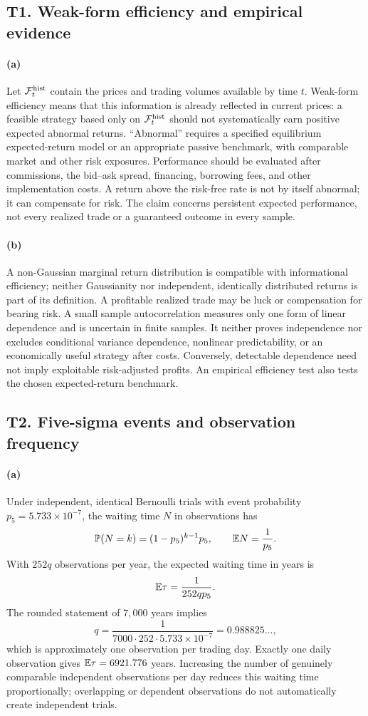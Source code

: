 \subsection{T1. Weak-form efficiency and empirical evidence}
\paragraph{(a)} Let $\mathcal F_t^{\rm hist}$ contain the prices and trading volumes available by time $t$. Weak-form efficiency means that this information is already reflected in current prices: a feasible strategy based only on $\mathcal F_t^{\rm hist}$ should not systematically earn positive expected abnormal returns. ``Abnormal'' requires a specified equilibrium expected-return model or an appropriate passive benchmark, with comparable market and other risk exposures. Performance should be evaluated after commissions, the bid--ask spread, financing, borrowing fees, and other implementation costs. A return above the risk-free rate is not by itself abnormal; it can compensate for risk. The claim concerns persistent expected performance, not every realized trade or a guaranteed outcome in every sample.
\paragraph{(b)} A non-Gaussian marginal return distribution is compatible with informational efficiency; neither Gaussianity nor independent, identically distributed returns is part of its definition. A profitable realized trade may be luck or compensation for bearing risk. A small sample autocorrelation measures only one form of linear dependence and is uncertain in finite samples. It neither proves independence nor excludes conditional variance dependence, nonlinear predictability, or an economically useful strategy after costs. Conversely, detectable dependence need not imply exploitable risk-adjusted profits. An empirical efficiency test also tests the chosen expected-return benchmark.

\subsection{T2. Five-sigma events and observation frequency}
\paragraph{(a)} Under independent, identical Bernoulli trials with event probability $p_5=5.733\times10^{-7}$, the waiting time $N$ in observations has
\[
 \mathbb P(N=k)=(1-p_5)^{k-1}p_5,\qquad \mathbb E N=\frac1{p_5}.
\]
With $252q$ observations per year, the expected waiting time in years is
\[
 \mathbb E\tau=\frac1{252q p_5}.
\]
The rounded statement of $7{,}000$ years implies
\[
 q=\frac1{7000\cdot252\cdot5.733\times10^{-7}}
   =0.988825\ldots,
\]
which is approximately one observation per trading day. Exactly one daily observation gives $\mathbb E\tau=6921.776$ years. Increasing the number of genuinely comparable independent observations per day reduces this waiting time proportionally; overlapping or dependent observations do not automatically create independent trials.

